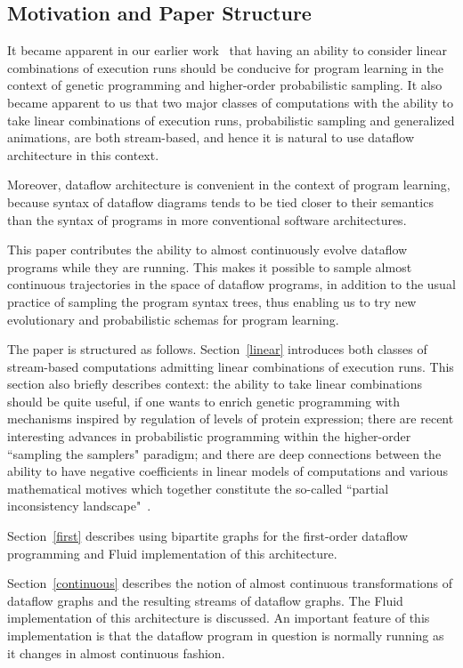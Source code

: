 \documentclass{llncs}
\begin{document}
\subsection{Motivation and Paper Structure}

It became apparent in our earlier work~\cite{MBukatinMatthews} that having an ability to consider linear combinations of execution runs
should be conducive for program learning in the context of genetic programming and higher-order probabilistic sampling. 
It also became apparent to us that two major classes of computations with the ability to take linear combinations of execution runs,
probabilistic sampling and generalized animations, are both stream-based, and hence it is natural to use dataflow architecture
in this context.

Moreover, dataflow architecture is convenient in the context of program learning, because syntax of dataflow diagrams tends to be
tied closer to their semantics than the syntax of programs in more conventional software architectures.

This paper contributes the ability to almost continuously evolve dataflow programs while they are running. This makes it possible
to sample almost continuous trajectories in the space of dataflow programs, in addition to the usual practice of sampling
the program syntax trees, thus enabling us to try new evolutionary and
probabilistic schemas for
program learning.

The paper is structured as follows. Section~\ref{linear} introduces both classes of stream-based computations admitting linear combinations
of execution runs. This section also briefly describes context:  the ability to take linear combinations should be quite useful, if one wants to enrich
genetic programming with mechanisms inspired by regulation of levels of protein expression; there are recent interesting advances in
probabilistic programming within the higher-order ``sampling the samplers" paradigm; and there are deep connections between
the ability to have negative coefficients in
linear models of computations and various mathematical motives which together constitute the so-called ``partial inconsistency landscape"~\cite{MBukatinMatthews}.

Section~\ref{first} describes using bipartite graphs for the first-order dataflow programming and Fluid implementation of this architecture.

Section~\ref{continuous} describes the notion of almost continuous transformations of dataflow graphs and the resulting streams
of dataflow graphs. The Fluid implementation of this architecture is discussed. An important feature of this implementation is that the dataflow program
in question is normally running as it changes in almost continuous fashion.
\end{document}
